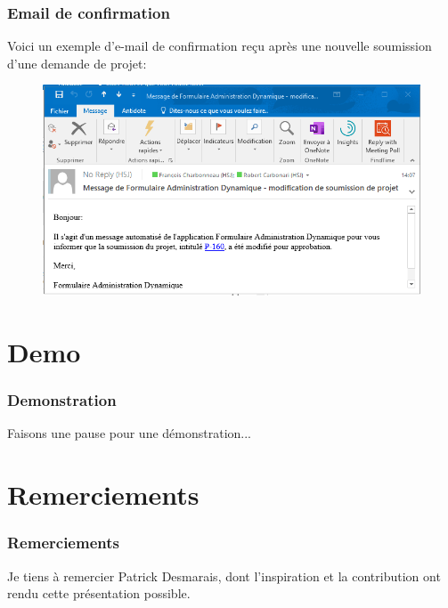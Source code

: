 \documentclass[aspectratio=169]{beamer}%
\begin{document}
\begin{frame}
\transwipe 
\frametitle{Email de confirmation}
Voici un exemple d'e-mail de confirmation reçu après une nouvelle soumission d'une demande de projet:
\begin{figure}
\includegraphics[scale=0.35]{emailConfResubmissionMsg}
\end{figure}
\end{frame}

\section{Demo}
\begin{frame}
\transwipe 
\frametitle{Demonstration}
\centering
Faisons une pause pour une démonstration...
\end{frame}


\section{Remerciements}
\begin{frame}
\transwipe 
\frametitle{Remerciements}
Je tiens à remercier Patrick Desmarais, dont l'inspiration et la contribution ont rendu cette présentation possible.

\end{frame}
\end{document}
